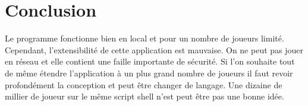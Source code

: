 \documentclass{article}
\begin{document}
\section{Conclusion}
Le programme fonctionne bien en local et pour un nombre de joueurs limité. Cependant, l'extensibilité de cette application est mauvaise. On ne peut pas jouer en réseau et elle contient une faille importante de sécurité. Si l'on souhaite tout de même étendre l'application à un plus grand nombre de joueurs il faut revoir profondément la conception et peut être changer de langage. Une dizaine de millier de joueur sur le même script shell n'est peut être pas une bonne idée.
\end{document}
